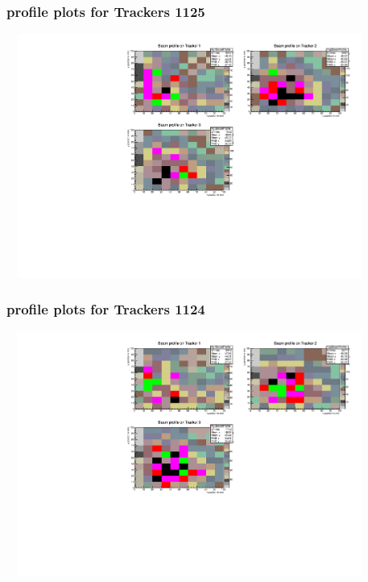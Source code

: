 \documentclass[slidestop,compress,mathserif]{beamer}
\begin{document}
\begin{frame}\frametitle{profile plots for Trackers 1125}
	 \includegraphics[width=12cm,height=8cm]{profile_plots_for_Trackers_1125.pdf}
\end{frame}
\begin{frame}\frametitle{profile plots for Trackers 1124}
	 \includegraphics[width=12cm,height=8cm]{profile_plots_for_Trackers_1124.pdf}
\end{frame}
\end{document}
